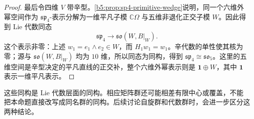 \begin{proof}
	最后令四维 \(V\) 带辛型。\cref{b5:prop:sp4-primitive-wedge}说明，同一个六维外幂空间作为 \(\mathfrak{sp}_4\)-表示分解为一维平凡子模 \(\mathbb C\Omega\) 与五维非退化正交子模 \(W\)。因此得到 Lie 代数同态
	\[
		\mathfrak{sp}_4\longrightarrow\mathfrak{so}(W,B|_W).
	\]
	这个表示非零：上述 \(w_1=e_1\wedge e_2\in W\)，而 \(H_1w_1=w_1\)。辛代数的单性使其核为零；源与 \(\mathfrak{so}(W,B|_W)\) 均为 \(10\) 维，所以同态为同构，得到 \(\mathfrak{sp}_4\cong\mathfrak{so}_5\)。这里的五维空间是辛型决定的平凡直线的正交补，整个六维外幂表示则是 \(\mathbf1\oplus W\)，其中 \(\mathbf1\) 表示一维平凡表示。
\end{proof}

这些同构是 Lie 代数层面的同构。相应矩阵群还可能相差有限中心或覆盖，不能把本命题直接改写成同名群的同构。后续讨论自旋群和代数群时，会进一步区分这两种结论。
